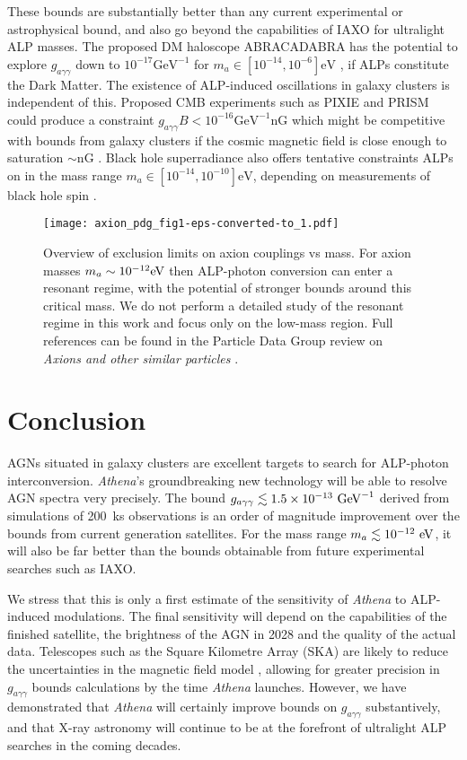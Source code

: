 \documentclass[fleqn,usenatbib,useAMS]{mnras}
\begin{document}
These bounds are substantially better than any current experimental or astrophysical bound, and also go beyond the capabilities of IAXO for ultralight ALP masses. The proposed DM haloscope ABRACADABRA has the potential to explore $g_{a \gamma \gamma}$ down to $10^{-17} \text{GeV}^{-1}$ for $m_a \in [10^{-14},10^{-6}] \text{eV}$  \citep{Kahn:2016aff}, if ALPs constitute the Dark Matter. The existence of ALP-induced oscillations in galaxy clusters is independent of this. Proposed CMB experiments such as PIXIE \citep{Kogut:2011xw} and PRISM \citep{Andre:2013afa} could produce a constraint $g_{a \gamma \gamma} B < 10^{-16} \text{GeV}^{-1} \text{nG}$ which might be competitive with bounds from galaxy clusters if the cosmic magnetic field is close enough to saturation $\sim \text{nG}$ \citep{Tashiro:2013yea}. Black hole superradiance also offers tentative constraints ALPs on in the mass range $m_a \in [10^{-14},10^{-10}] \text{eV}$, depending on measurements of black hole spin \citep{Arvanitaki:2016qwi}.

\begin{figure}
\texttt{[image: axion\_pdg\_fig1-eps-converted-to\_1.pdf]}
\caption{Overview of exclusion limits on axion couplings vs mass. For axion masses $m_a \sim 10^{-12} {\rm eV}$ then ALP-photon conversion
can enter a resonant regime, with the potential of stronger bounds around this critical mass. We do not perform a detailed study of the resonant
regime in this work and focus only on the low-mass region. Full references can be found in the Particle Data Group review on {\it Axions and other similar particles} \citep{Patrignani:2016xqp}.}\label{fig:ExclusionLimit}
\end{figure}

\section{Conclusion}
\label{conclusion}
AGNs situated in galaxy clusters are excellent targets to search for ALP-photon interconversion. {\it Athena}'s groundbreaking new technology will be able to resolve AGN spectra very precisely. The bound ${g_{a\gamma\gamma} \lesssim 1.5 \times 10^{-13}~ \rm{GeV}^{-1}}$ derived from simulations of 200~ks observations is an order of magnitude improvement over the bounds from current generation satellites. For the mass range ${m_a \lesssim 10^{-12}~\rm{eV}}$, it will also be far better than the bounds obtainable from future experimental searches such as IAXO.


We stress that this is only a first estimate of  the sensitivity of {\it Athena} to ALP-induced modulations. The final sensitivity will depend on the capabilities of the finished satellite, the brightness of the AGN in 2028 and the quality of the actual data.
Telescopes such as the Square Kilometre Array (SKA) are likely to reduce the uncertainties in the magnetic field model \citep{Braun:2015zta}, allowing for greater precision in $g_{a \gamma \gamma}$ bounds calculations by the time {\it Athena} launches. However, we have demonstrated that {\it Athena} will certainly improve bounds on $g_{a \gamma \gamma}$ substantively, and that X-ray astronomy will continue to be at the forefront of ultralight ALP searches in the coming decades.
\end{document}
